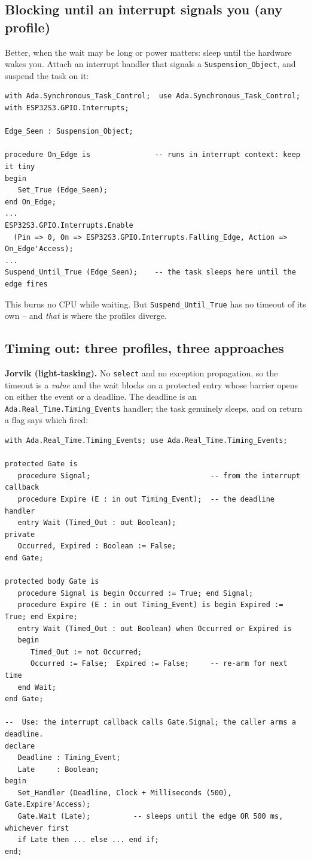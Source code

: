 \subsection{Blocking until an interrupt signals you (any profile)}

Better, when the wait may be long or power matters: sleep until the hardware wakes
you. Attach an interrupt handler that signals a \texttt{Suspension\_Object}, and
suspend the task on it:

\begin{lstlisting}
with Ada.Synchronous_Task_Control;  use Ada.Synchronous_Task_Control;
with ESP32S3.GPIO.Interrupts;

Edge_Seen : Suspension_Object;

procedure On_Edge is               -- runs in interrupt context: keep it tiny
begin
   Set_True (Edge_Seen);
end On_Edge;
...
ESP32S3.GPIO.Interrupts.Enable
  (Pin => 0, On => ESP32S3.GPIO.Interrupts.Falling_Edge, Action => On_Edge'Access);
...
Suspend_Until_True (Edge_Seen);    -- the task sleeps here until the edge fires
\end{lstlisting}

This burns no CPU while waiting. But \texttt{Suspend\_Until\_True} has no timeout
of its own -- and \emph{that} is where the profiles diverge.

\subsection{Timing out: three profiles, three approaches}

\textbf{Jorvik (light-tasking).} No \texttt{select} and no exception propagation,
so the timeout is a \emph{value} and the wait blocks on a protected entry whose
barrier opens on either the event or a deadline. The deadline is an
\texttt{Ada.Real\_Time.Timing\_Events} handler; the task genuinely sleeps, and on
return a flag says which fired:

\begin{lstlisting}
with Ada.Real_Time.Timing_Events; use Ada.Real_Time.Timing_Events;

protected Gate is
   procedure Signal;                            -- from the interrupt callback
   procedure Expire (E : in out Timing_Event);  -- the deadline handler
   entry Wait (Timed_Out : out Boolean);
private
   Occurred, Expired : Boolean := False;
end Gate;

protected body Gate is
   procedure Signal is begin Occurred := True; end Signal;
   procedure Expire (E : in out Timing_Event) is begin Expired := True; end Expire;
   entry Wait (Timed_Out : out Boolean) when Occurred or Expired is
   begin
      Timed_Out := not Occurred;
      Occurred := False;  Expired := False;     -- re-arm for next time
   end Wait;
end Gate;

--  Use: the interrupt callback calls Gate.Signal; the caller arms a deadline.
declare
   Deadline : Timing_Event;
   Late     : Boolean;
begin
   Set_Handler (Deadline, Clock + Milliseconds (500), Gate.Expire'Access);
   Gate.Wait (Late);          -- sleeps until the edge OR 500 ms, whichever first
   if Late then ... else ... end if;
end;
\end{lstlisting}


